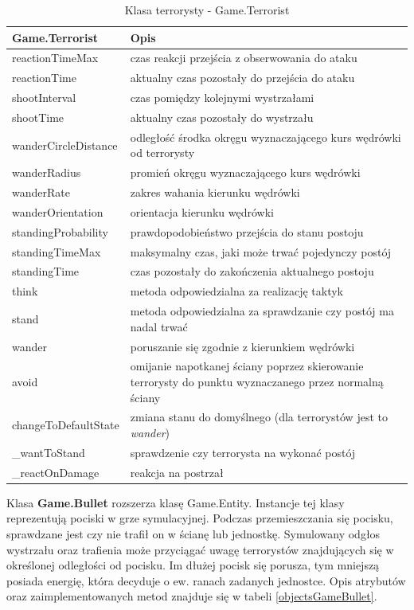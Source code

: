 \begin{table}
\begin{center}
\begin{tabular}{|p{}|p{}|}
\hline
\textbf{Game.Terrorist} & Opis\\\hline		
	reactionTimeMax & czas reakcji przejścia  z obserwowania do ataku\\
	reactionTime & aktualny czas pozostały do przejścia do ataku\\
	shootInterval & czas pomiędzy kolejnymi wystrzałami\\
	shootTime & aktualny czas pozostały do wystrzału\\
	wanderCircleDistance & odległość środka okręgu wyznaczającego kurs wędrówki od terrorysty\\
	wanderRadius & promień okręgu wyznaczającego kurs wędrówki\\
	wanderRate & zakres wahania kierunku wędrówki\\
	wanderOrientation & orientacja kierunku wędrówki\\
	standingProbability & prawdopodobieństwo przejścia do stanu postoju\\
	standingTimeMax & maksymalny czas, jaki może trwać pojedynczy postój\\
	standingTime & czas pozostały do zakończenia aktualnego postoju
\\\hline
	think & metoda odpowiedzialna za realizację taktyk\\
	stand & metoda odpowiedzialna za sprawdzanie czy postój ma nadal trwać\\
	wander & poruszanie się zgodnie z kierunkiem wędrówki\\
	avoid & omijanie napotkanej ściany poprzez skierowanie terrorysty do punktu wyznaczanego przez normalną ściany\\
	changeToDefaultState & zmiana stanu do domyślnego (dla terrorystów jest to \emph{wander})\\
	\_wantToStand & sprawdzenie czy terrorysta na wykonać postój\\
	\_reactOnDamage & reakcja na postrzał
\\\hline
\end{tabular}
\caption {Klasa terrorysty - Game.Terrorist\label{objectsGameTerrorist}}
\end{center}
\end{table} 

Klasa \textbf{Game.Bullet} rozszerza klasę Game.Entity. Instancje tej klasy reprezentują pociski w grze symulacyjnej. Podczas przemieszczania się pocisku, sprawdzane jest czy nie trafił on w ścianę lub jednostkę. Symulowany odgłos wystrzału oraz trafienia może przyciągać uwagę terrorystów znajdujących się w określonej odległości od pocisku. Im dłużej pocisk się porusza, tym mniejszą posiada energię, która decyduje o ew. ranach zadanych jednostce. Opis atrybutów oraz zaimplementowanych metod znajduje się w tabeli \ref{objectsGameBullet}. 

